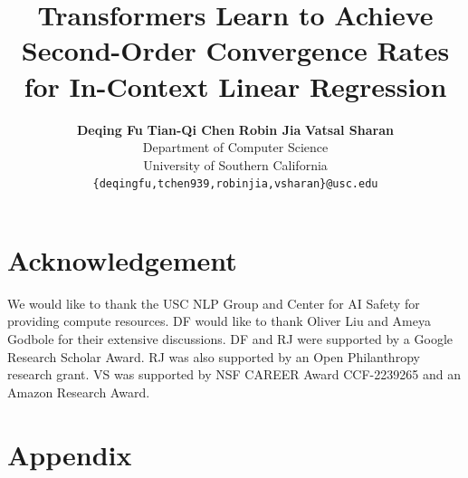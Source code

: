 \documentclass[11pt]{article}
\title{Transformers Learn to Achieve Second-Order Convergence Rates for In-Context Linear Regression}
\author{%
\textbf{Deqing Fu} \aspace
\textbf{Tian-Qi Chen} \aspace
\textbf{Robin Jia}\aspace
\textbf{Vatsal Sharan}\\ %
Department of Computer Science\\
University of Southern California\\
\texttt{\{deqingfu,tchen939,robinjia,vsharan\}@usc.edu} \\
}
\date{}
\theoremstyle{plain}
\theoremstyle{definition}
\theoremstyle{remark}
\renewcommand{\paragraph}[1]{\vspace{1mm}\noindent\textbf{#1}}
\begin{document}
\maketitle



\begin{abstract}

\end{abstract}








\section*{Acknowledgement}
We would like to thank the USC NLP Group and Center for AI Safety for providing compute resources. DF would like to thank Oliver Liu and Ameya Godbole for their extensive discussions. 
DF and RJ were supported by a Google Research Scholar Award.
RJ was also supported by an Open Philanthropy research grant.
VS was supported by NSF CAREER Award CCF-2239265 and an Amazon Research Award.




\clearpage
\onecolumn
\section*{Appendix}
\appendix
\startcontents[appendix]
\renewcommand{\thesection}{\Alph{section}} 


\setcounter{section}{0}

 



\iffalse
\end{document}
